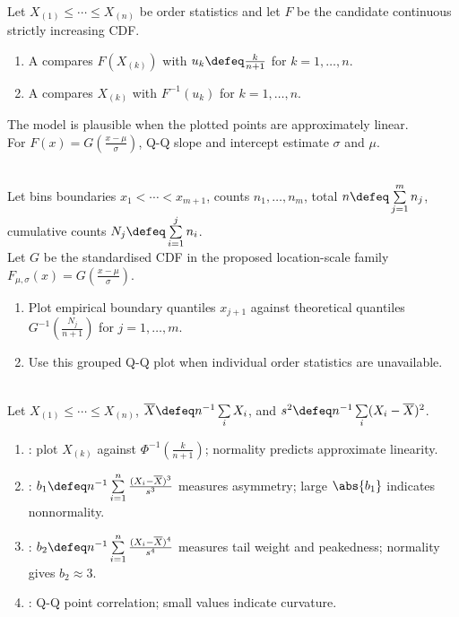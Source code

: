 \begin{method} \label{meth:probability-plot-construction} \\
Let $X_{(1)}\leq\cdots\leq X_{(n)}$ be order statistics and let $F$ be the candidate continuous strictly increasing CDF.
\begin{enumerate}[label=(\roman*)]
\setlength{\itemsep}{0pt}
\item A  compares $F(X_{(k)})$ with $u_k\defeq \frac{k}{n+1}$ for $k=1,\ldots,n$.
\item A  compares $X_{(k)}$ with $F^{-1}(u_k)$ for $k=1,\ldots,n$.
\end{enumerate}
The model is plausible when the plotted points are approximately linear.\\
For $F(x)=G(\frac{x-\mu}{\sigma})$, Q-Q slope and intercept estimate $\sigma$ and $\mu$.
\end{method}

\begin{method} \label{meth:probability-plots-for-grouped-data} \\
Let bins boundaries $x_1<\cdots<x_{m+1}$, counts $n_1,\ldots,n_m$, total $n\defeq\sum\limits_{j=1}^mn_j$, cumulative counts $N_j\defeq\sum\limits_{i=1}^jn_i$.\\
Let $G$ be the standardised CDF in the proposed location-scale family $F_{\mu,\sigma}(x)=G(\frac{x-\mu}{\sigma})$.
\begin{enumerate}[label=(\roman*)]
\setlength{\itemsep}{0pt}
\item Plot empirical boundary quantiles $x_{j+1}$ against theoretical quantiles $G^{-1}(\frac{N_j}{n+1})$ for $j=1,\ldots,m$.
\item Use this grouped Q-Q plot when individual order statistics are unavailable.
\end{enumerate}
\end{method}

\begin{definition} \label{def:normality-diagnostics} \\
Let $X_{(1)}\leq\cdots\leq X_{(n)}$, $\overline{X}\defeq n^{-1}\sum\limits_iX_i$, and $s^2\defeq n^{-1}\sum\limits_i(X_i-\overline{X})^2$.
\begin{enumerate}[label=(\roman*)]
\setlength{\itemsep}{0pt}
\item {}: plot $X_{(k)}$ against $\Phi^{-1}(\frac{k}{n+1})$; normality predicts approximate linearity.
\item {}: $b_1\defeq n^{-1}\sum\limits_{i=1}^n\frac{(X_i-\overline{X})^3}{s^3}$ measures asymmetry; large $\abs{b_1}$ indicates nonnormality.
\item {}: $b_2\defeq n^{-1}\sum\limits_{i=1}^n\frac{(X_i-\overline{X})^4}{s^4}$ measures tail weight and peakedness; normality gives $b_2\approx3$.
\item {}: Q-Q point correlation; small values indicate curvature.
\end{enumerate}
\end{definition}

